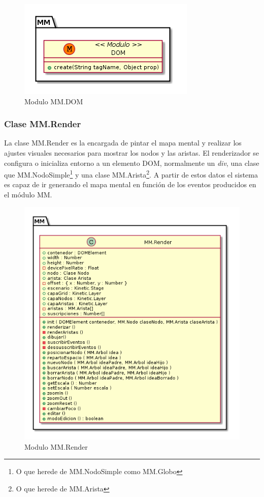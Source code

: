 \begin{figure}[tbph]
\centering
\includegraphics[width=0.4\linewidth]{imagenes/diagrama-clase-mm-dom}
\caption{Modulo MM.DOM}

\label{fig:diagrama-clase-mm-dom}
\end{figure}



\subsubsection{Clase MM.Render}

La clase MM.Render es la encargada de pintar el mapa mental y realizar los ajustes visuales necesarios para mostrar los nodos y las aristas. El renderizador se configura o inicializa entorno a un elemento DOM, normalmente un \textit{div}, una clase que MM.NodoSimple\footnote{O que herede de MM.NodoSimple como MM.Globo} y una clase MM.Arista\footnote{O que herede de MM.Arista}. A partir de estos datos el sistema es capaz de ir generando el mapa mental en función de los eventos producidos en el módulo MM. 

\begin{figure}[tbph]
\centering
\includegraphics[width=0.65\linewidth]{imagenes/diagrama-clase-mm-render}
\caption{Modulo MM.Render}

\label{fig:diagrama-clase-mm-render}
\end{figure}

